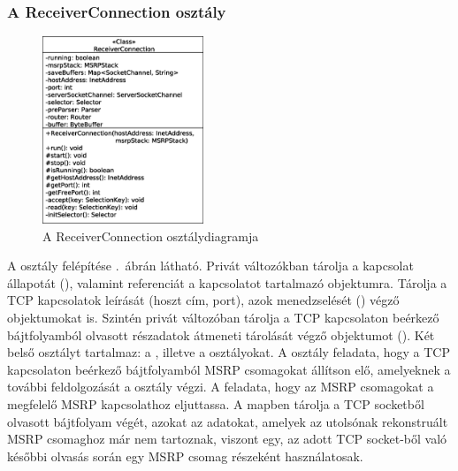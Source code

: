 \subsubsection*{A ReceiverConnection osztály}
\label{sec:msrp_receiverconnection}

\begin{figure}
  \vspace{-40pt}
  \begin{center}
    \includegraphics[width=0.43\textwidth]{img/class_diagrams/ReceiverConnection.eps}
  \end{center}
  \vspace{-15pt}
  \captionsetup{font=scriptsize}
  \caption{A ReceiverConnection osztálydiagramja}
   \label{fig:class_receiverconnection}
  \vspace{-10pt}
\end{figure}
A osztály felépítése .~ábrán látható. Privát változókban tárolja a kapcsolat állapotát (), valamint referenciát a kapcsolatot tartalmazó  objektumra. Tárolja a TCP kapcsolatok leírását (hoszt cím, port), azok menedzselését () végző objektumokat is. Szintén privát változóban tárolja a TCP kapcsolaton beérkező bájtfolyamból olvasott részadatok átmeneti tárolását végző objektumot (). Két belső osztályt tartalmaz: a , illetve a  osztályokat. A  osztály feladata, hogy a TCP kapcsolaton beérkező bájtfolyamból MSRP csomagokat állítson elő, amelyeknek a további feldolgozását a  osztály végzi. A  feladata, hogy az MSRP csomagokat a megfelelő MSRP kapcsolathoz eljuttassa. A  mapben tárolja a TCP socketből olvasott bájtfolyam végét, azokat az adatokat, amelyek az utolsónak rekonstruált MSRP csomaghoz már nem tartoznak, viszont egy, az adott TCP socket-ből való későbbi olvasás során egy MSRP csomag részeként használatosak.

